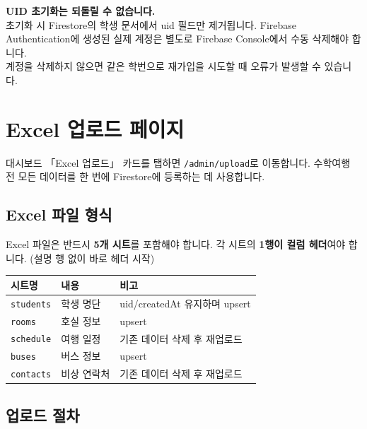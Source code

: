 \documentclass[a4paper,11pt]{article}
\begin{document}
\begin{tcolorbox}[dangerbox]
\textbf{UID 초기화는 되돌릴 수 없습니다.}\\
초기화 시 Firestore의 학생 문서에서 uid 필드만 제거됩니다.
Firebase Authentication에 생성된 실제 계정은 별도로 Firebase Console에서 수동 삭제해야 합니다.\\
계정을 삭제하지 않으면 같은 학번으로 재가입을 시도할 때 오류가 발생할 수 있습니다.
\end{tcolorbox}

\section{Excel 업로드 페이지}

대시보드 「Excel 업로드」 카드를 탭하면 \texttt{/admin/upload}로 이동합니다.
수학여행 전 모든 데이터를 한 번에 Firestore에 등록하는 데 사용합니다.

\subsection{Excel 파일 형식}

\begin{tcolorbox}[warnbox]
Excel 파일은 반드시 \textbf{5개 시트}를 포함해야 합니다.
각 시트의 \textbf{1행이 컬럼 헤더}여야 합니다. (설명 행 없이 바로 헤더 시작)
\end{tcolorbox}

\begin{center}
\begin{tabular}{@{}lll@{}}
  \toprule
  \textbf{시트명} & \textbf{내용} & \textbf{비고} \\
  \midrule
  \texttt{students} & 학생 명단 & uid/createdAt 유지하며 upsert \\
  \texttt{rooms} & 호실 정보 & upsert \\
  \texttt{schedule} & 여행 일정 & 기존 데이터 삭제 후 재업로드 \\
  \texttt{buses} & 버스 정보 & upsert \\
  \texttt{contacts} & 비상 연락처 & 기존 데이터 삭제 후 재업로드 \\
  \bottomrule
\end{tabular}
\end{center}

\subsection{업로드 절차}
\end{document}
